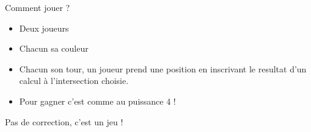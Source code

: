 \numeroteEnigme
\begin{enigme}
    Comment jouer ?
    \begin{itemize}
        \item Deux joueurs
        \item Chacun sa couleur
        \item Chacun son tour, un joueur prend une position en inscrivant le resultat d'un calcul à l'intersection choisie.
        \item Pour gagner c'est comme au puissance 4 !
    \end{itemize}
    
    \PQuatre[Relatif,Couleur=.2Gray+.8White]{}
\end{enigme}

\addtocounter{exercice}{-1}
\begin{corrige}
Pas de correction, c'est un jeu !
\end{corrige}